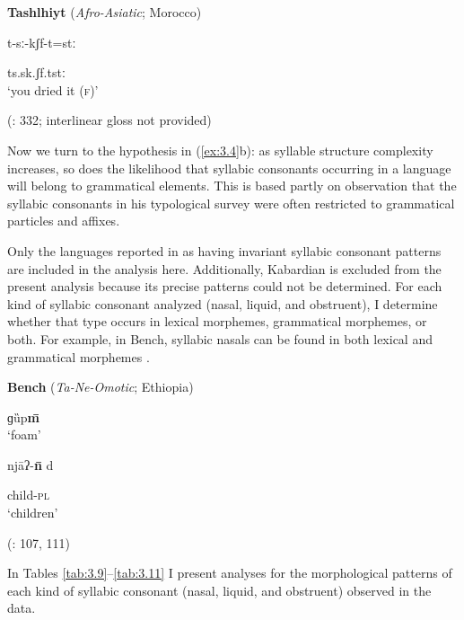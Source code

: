 \ea\label{ex:3.24}
  \textbf{Tashlhiyt} (\textit{Afro-Asiatic}; Morocco)

t-sː-kʃf-t=stː

ts.sk.ʃf.tstː\\
\glt ‘you dried it (\textsc{f})’

(\citealt{Ridouane2008}: 332; interlinear gloss not provided)
\z

  Now we turn to the hypothesis in (\ref{ex:3.4}b): as syllable structure complexity increases, so does the likelihood that syllabic consonants occurring in a language will belong to grammatical elements. This is based partly on  observation that the syllabic consonants in his typological survey were often restricted to grammatical particles and affixes.

  Only the languages reported in  as having invariant syllabic consonant patterns are included in the analysis here. Additionally, Kabardian is excluded from the present analysis because its precise patterns could not be determined. For each kind of syllabic consonant analyzed (nasal, liquid, and obstruent), I determine whether that type occurs in lexical morphemes, grammatical morphemes, or both. For example, in Bench, syllabic nasals can be found in both lexical and grammatical morphemes .

\ea\label{ex:3.25}
  \textbf{Bench} (\textit{Ta-Ne-Omotic}; Ethiopia)

\ea   ɡȕp\textbf{m\={} }\\
\glt ‘foam’

\ex   njāʔ-\textbf{n\={} }d

child-\textsc{pl}\\
\glt ‘children’

(\citealt{Rapold2006}: 107, 111)
\z
\z

  In Tables \ref{tab:3.9}--\ref{tab:3.11} I present analyses for the morphological patterns of each kind of syllabic consonant (nasal, liquid, and obstruent) observed in the data.

